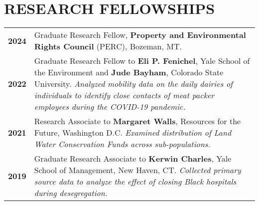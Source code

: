 \documentclass[11pt]{article}
\begin{document}
\section*{RESEARCH FELLOWSHIPS}
\begin{tabularx}{\linewidth}{>{\bfseries}r X} %
2024 & Graduate Research Fellow, \textbf{Property and Environmental Rights Council} (PERC), Bozeman, MT. \\
2022 & Graduate Research Fellow to \textbf{Eli P. Fenichel}, Yale School of the Environment and \textbf{Jude Bayham}, Colorado State University. \textit{Analyzed mobility data on the daily dairies of individuals to identify close contacts of meat packer employees during the COVID-19 pandemic.} \\
2021 & Research Associate to \textbf{Margaret Walls}, Resources for the Future, Washington D.C. \textit{Examined distribution of Land Water Conservation Funds across sub-populations.}\\
2019 & Graduate Research Associate to \textbf{Kerwin Charles}, Yale School of Management, New Haven, CT. \textit{Collected primary source data to analyze the effect of closing Black hospitals during desegregation.} \\
\end{tabularx}
\end{document}
